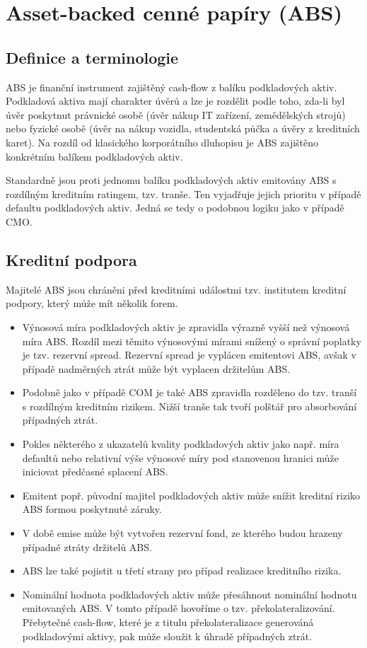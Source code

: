 \documentclass[a4paper]{book}
\begin{document}
\section{Asset-backed cenné papíry (ABS)}

\subsection{Definice a terminologie}

ABS je finanční instrument zajištěný cash-flow z balíku podkladových aktiv. Podkladová aktiva mají charakter úvěrů a lze je rozdělit podle toho, zda-li byl úvěr poskytnut právnické osobě (úvěr nákup IT zařízení, zemědělských strojů) nebo fyzické osobě (úvěr na nákup vozidla, studentská půčka a úvěry z kreditních karet). Na rozdíl od klasického korporátního dluhopisu je ABS zajištěno konkrétním balíkem podkladových aktiv.

Standardně jsou proti jednomu balíku podkladových aktiv emitovány ABS s rozdílným kreditním ratingem, tzv. tranše. Ten vyjadřuje jejich prioritu v případě defaultu podkladových aktiv. Jedná se tedy o podobnou logiku jako v případě CMO.

\subsection{Kreditní podpora}

Majitelé ABS jsou chráněni před kreditními událostmi tzv. institutem kreditní podpory, který může mít několik forem.
\begin{itemize}
\item Výnosová míra podkladových aktiv je zpravidla výrazně vyšší než výnosová míra ABS. Rozdíl mezi těmito výnosovými mírami snížený o správní poplatky je tzv. rezervní spread. Rezervní spread je vyplácen emitentovi ABS, avšak v případě nadměrných ztrát může být vyplacen držitelům ABS.
\item Podobně jako v případě COM je také ABS zpravidla rozděleno do tzv. tranší s rozdílným kreditním rizikem. Nižší tranše tak tvoří polštář pro absorbování případných ztrát.
\item Pokles některého z ukazatelů kvality podkladových aktiv jako např. míra defaultů nebo relativní výše výnosové míry pod stanovenou hranici může iniciovat předčasné splacení ABS.
\item Emitent popř. původní majitel podkladových aktiv může snížit kreditní riziko ABS formou poskytnuté záruky.
\item V době emise může být vytvořen rezervní fond, ze kterého budou hrazeny případné ztráty držitelů ABS.
\item ABS lze také pojistit u třetí strany pro případ realizace kreditního rizika.
\item Nominální hodnota podkladových aktiv může přesáhnout nominální hodnotu emitovaných ABS. V tomto případě hovoříme o tzv. překolateralizování. Přebytečné cash-flow, které je z titulu překolateralizace generováná podkladovými aktivy, pak může sloužit k úhradě případných ztrát.
\end{itemize}
\end{document}
